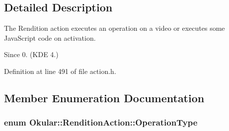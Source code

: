 \subsection{Detailed Description}
The Rendition action executes an operation on a video or executes some Java\+Script code on activation.

\begin{DoxySince}{Since}
0. (K\+D\+E 4.) 
\end{DoxySince}


Definition at line 491 of file action.\+h.



\subsection{Member Enumeration Documentation}
\hypertarget{classOkular_1_1RenditionAction_ae036a78aa4d9997df70e856410cbc1a5}{
\subsubsection[{Operation\+Type}]{\setlength{\rightskip}{0pt plus 5cm}enum {\bf Okular\+::\+Rendition\+Action\+::\+Operation\+Type}}}\label{classOkular_1_1RenditionAction_ae036a78aa4d9997df70e856410cbc1a5}

